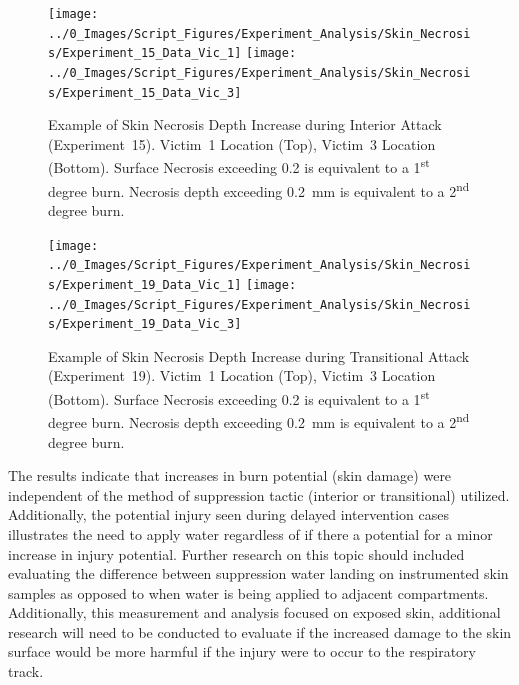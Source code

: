 \documentclass[12pt,oneside]{book}
\begin{document}
\begin{figure}[H]
\centering
\texttt{[image: ../0\_Images/Script\_Figures/Experiment\_Analysis/Skin\_Necrosis/Experiment\_15\_Data\_Vic\_1]}
\texttt{[image: ../0\_Images/Script\_Figures/Experiment\_Analysis/Skin\_Necrosis/Experiment\_15\_Data\_Vic\_3]}
\caption{Example of Skin Necrosis Depth Increase during Interior Attack (Experiment~15). Victim~1 Location (Top), Victim~3 Location (Bottom). Surface Necrosis exceeding 0.2 is equivalent to a 1\textsuperscript{st} degree burn. Necrosis depth exceeding 0.2~mm is equivalent to a 2\textsuperscript{nd} degree burn.}
\label{fig:necrosis_increase_interior}
\end{figure}

\begin{figure}[H]
\centering
\texttt{[image: ../0\_Images/Script\_Figures/Experiment\_Analysis/Skin\_Necrosis/Experiment\_19\_Data\_Vic\_1]}
\texttt{[image: ../0\_Images/Script\_Figures/Experiment\_Analysis/Skin\_Necrosis/Experiment\_19\_Data\_Vic\_3]}
\caption{Example of Skin Necrosis Depth Increase during Transitional Attack (Experiment~19). Victim~1 Location (Top), Victim~3 Location (Bottom). Surface Necrosis exceeding 0.2 is equivalent to a 1\textsuperscript{st} degree burn. Necrosis depth exceeding 0.2~mm is equivalent to a 2\textsuperscript{nd} degree burn.}
\label{fig:necrosis_increase_exterior}
\end{figure}

The results indicate that increases in burn potential (skin damage) were independent of the method of suppression tactic (interior or transitional) utilized. Additionally, the potential injury seen during delayed intervention cases illustrates the need to apply water regardless of if there a potential for a minor increase in injury potential.  Further research on this topic should included evaluating the difference between suppression water landing on instrumented skin samples as opposed to when water is being applied to adjacent compartments. Additionally, this measurement and analysis focused on exposed skin, additional research will need to be conducted to evaluate if the increased damage to the skin surface would be more harmful if the injury were to occur to the respiratory track. 



\end{document}
